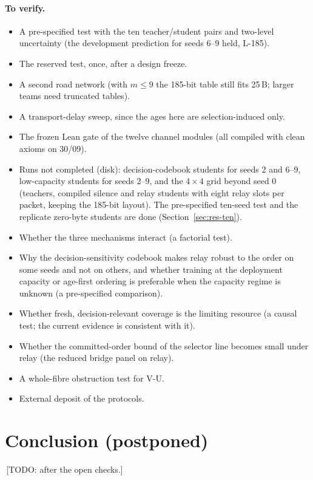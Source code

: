 \documentclass[11pt]{article}
\theoremstyle{definition}
\newif\ifshownotes\shownotestrue
\newcommand{\TODO}[1]{\ifshownotes{\color{todocol}\,\textsf{\footnotesize[TODO: #1]}}\fi}
\begin{document}
\paragraph{To verify.}
\begin{itemize}
\item A pre-specified test with the ten teacher/student pairs and two-level uncertainty (the development prediction for
seeds 6--9 held, L-185).
\item The reserved test, once, after a design freeze.
\item A second road network (with $m\le9$ the 185-bit table still fits 25\,B; larger teams need truncated tables).
\item A transport-delay sweep, since the ages here are selection-induced only.
\item The frozen Lean gate of the twelve channel modules (all compiled with clean axioms on 30/09).
\item Runs not completed (disk): decision-codebook students for seeds 2 and 6--9, low-capacity students for seeds 2--9,
and the $4\times4$ grid beyond seed 0 (teachers, compiled silence and relay students with eight relay slots per packet,
keeping the 185-bit layout). The pre-specified ten-seed test and the replicate zero-byte students are done
(Section~\ref{sec:res-ten}).
\item Whether the three mechanisms interact (a factorial test).
\item Why the decision-sensitivity codebook makes relay robust to the order on some seeds and not on others, and whether training at the deployment
capacity or age-first ordering is preferable when the capacity regime is unknown (a pre-specified comparison).
\item Whether fresh, decision-relevant coverage is the limiting resource (a causal test; the current evidence is
consistent with it).
\item Whether the committed-order bound of the selector line becomes small under relay (the reduced bridge panel on relay).
\item A whole-fibre obstruction test for V-U.
\item External deposit of the protocols.
\end{itemize}

\section{Conclusion (postponed)}\label{sec:concl}
\TODO{after the open checks.}
\end{document}
